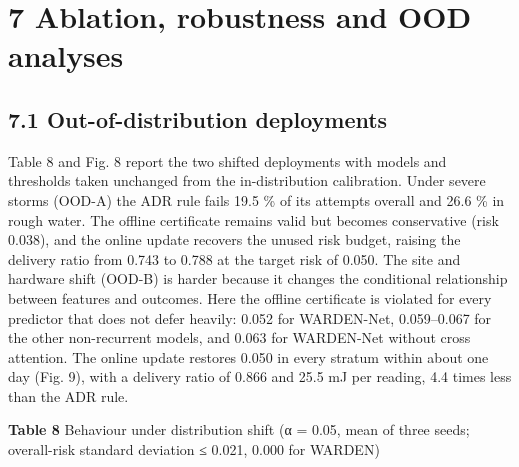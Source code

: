 \documentclass[
  11pt,
]{article}
\begin{document}
\hypertarget{ablation-robustness-and-ood-analyses}{%
\section{7 Ablation, robustness and OOD
analyses}\label{ablation-robustness-and-ood-analyses}}

\hypertarget{out-of-distribution-deployments}{%
\subsection{7.1 Out-of-distribution
deployments}\label{out-of-distribution-deployments}}

Table 8 and Fig. 8 report the two shifted deployments with models and
thresholds taken unchanged from the in-distribution calibration. Under
severe storms (OOD-A) the ADR rule fails 19.5 \% of its attempts overall
and 26.6 \% in rough water. The offline certificate remains valid but
becomes conservative (risk 0.038), and the online update recovers the
unused risk budget, raising the delivery ratio from 0.743 to 0.788 at
the target risk of 0.050. The site and hardware shift (OOD-B) is harder
because it changes the conditional relationship between features and
outcomes. Here the offline certificate is violated for every predictor
that does not defer heavily: 0.052 for WARDEN-Net, 0.059--0.067 for the
other non-recurrent models, and 0.063 for WARDEN-Net without cross
attention. The online update restores 0.050 in every stratum within
about one day (Fig. 9), with a delivery ratio of 0.866 and 25.5 mJ per
reading, 4.4 times less than the ADR rule.


\textbf{Table 8} Behaviour under distribution shift (α = 0.05, mean of
three seeds; overall-risk standard deviation ≤ 0.021, 0.000 for WARDEN)
\end{document}

